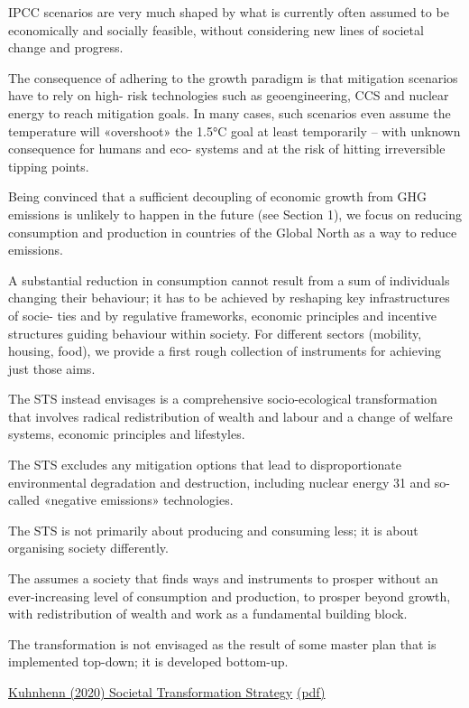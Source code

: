 \documentclass[
]{book}
\begin{document}
IPCC scenarios are very much shaped by what is currently often
assumed to be economically and socially feasible, without considering new lines of
societal change and progress.

The consequence
of adhering to the growth paradigm is that mitigation scenarios have to rely on high-
risk technologies such as geoengineering, CCS and nuclear energy to reach mitigation
goals. In many cases, such scenarios even assume the temperature will «overshoot»
the 1.5°C goal at least temporarily -- with unknown consequence for humans and eco-
systems and at the risk of hitting irreversible tipping points.

Being convinced that a sufficient decoupling of economic growth from GHG
emissions is unlikely to happen in the future (see Section 1), we focus on reducing
consumption and production in countries of the Global North as a way to reduce
emissions.

A substantial
reduction in consumption cannot result from a sum of individuals changing
their behaviour; it has to be achieved by reshaping key infrastructures of socie-
ties and by regulative frameworks, economic principles and incentive structures
guiding behaviour within society. For different sectors (mobility, housing, food),
we provide a first rough collection of instruments for achieving just those aims.

The STS instead envisages is a comprehensive socio-ecological transformation
that involves radical redistribution of wealth and labour and a change of welfare
systems, economic principles and lifestyles.

The STS excludes any mitigation options that lead to
disproportionate environmental degradation and destruction, including nuclear
energy 31 and so-called «negative emissions» technologies.

The STS is not primarily
about producing and consuming less; it is about organising society differently.

The assumes a society that finds ways and instruments to prosper
without an ever-increasing level of consumption and production, to prosper beyond
growth, with redistribution of wealth and work as a fundamental building block.

The transformation is not envisaged as the result of some master plan that is
implemented top-down; it is developed bottom-up.

\href{https://eu.boell.org/en/2020/12/09/societal-transformation-scenario-staying-below-15degc}{Kuhnhenn (2020) Societal Transformation Strategy}
\href{pdf/Kuhnhenn_2020_STS.pdf}{(pdf)}
\end{document}
